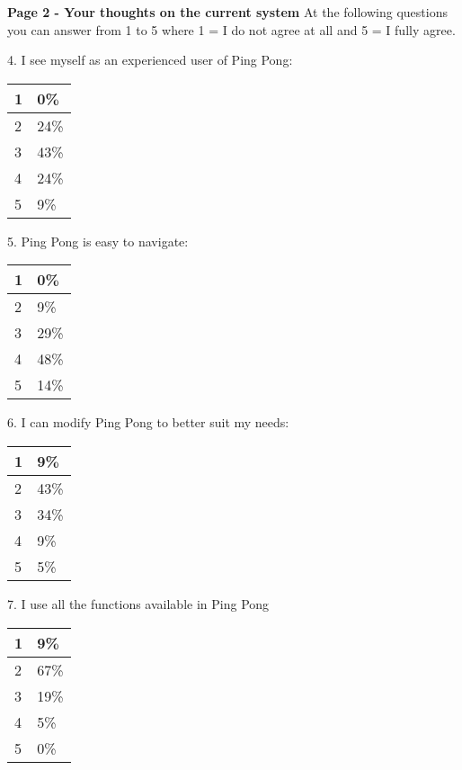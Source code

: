 \textbf{Page 2 - Your thoughts on the current system}
At the following questions you can answer from 1 to 5 where 1 = I do not agree at all and 5 = I fully agree.

4. I see myself as an experienced user of Ping Pong:

\begin{center}
    \begin{tabular}{ | l | l | }
    \hline
    1 & 0\% \\ \hline
	2 & 24\% \\ \hline
	3 & 43\% \\ \hline
	4 & 24\% \\ \hline
	5 & 9\% \\ \hline
    \end{tabular}
\end{center}

5. Ping Pong is easy to navigate:

\begin{center}
    \begin{tabular}{ | l | l | }
    \hline
    1 & 0\% \\ \hline
	2 & 9\% \\ \hline
	3 & 29\% \\ \hline
	4 & 48\% \\ \hline
	5 & 14\% \\ \hline
    \end{tabular}
\end{center}

6. I can modify Ping Pong to better suit my needs:

\begin{center}
    \begin{tabular}{ | l | l | }
    \hline
    1 & 9\% \\ \hline
	2 & 43\% \\ \hline
	3 & 34\% \\ \hline
	4 & 9\% \\ \hline
	5 & 5\% \\ \hline
    \end{tabular}
\end{center}

7. I use all the functions available in Ping Pong

\begin{center}
    \begin{tabular}{ | l | l | }
    \hline
    1 & 9\% \\ \hline
	2 & 67\% \\ \hline
	3 & 19\% \\ \hline
	4 & 5\% \\ \hline
	5 & 0\% \\ \hline
    \end{tabular}
\end{center}

